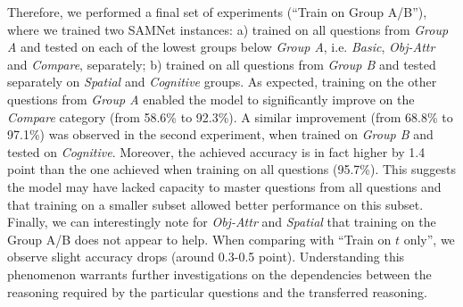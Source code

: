 Therefore, we performed a final set of experiments (``Train on Group A/B''), where we trained two SAMNet instances: a) trained on all questions from \textit{Group A} and tested on each of the lowest groups below \textit{Group A}, i.e. \textit{Basic}, \textit{Obj-Attr} and \textit{Compare}, separately; b) trained on all questions from \textit{Group B} and tested separately on \textit{Spatial} and \textit{Cognitive} groups.
As expected, training on the other questions from \textit{Group A} enabled the model to significantly improve on the \textit{Compare} category (from 58.6\% to 92.3\%).
A similar improvement (from 68.8\% to 97.1\%) was observed in the second experiment, when trained on \textit{Group B} and tested on \textit{Cognitive}.
Moreover, the achieved accuracy is in fact higher by 1.4 point than the one achieved when training on all questions (95.7\%).
This suggests the model may have lacked capacity to master questions from all questions and that training on a smaller subset allowed better performance on this subset.
Finally, we can interestingly note for \textit{Obj-Attr} and \textit{Spatial} that training on the Group A/B does not appear to help. When comparing with ``Train on $t$ only'', we observe slight accuracy drops (around 0.3-0.5 point).
Understanding this phenomenon warrants further investigations on the dependencies between the reasoning required by the particular questions and the transferred reasoning.
